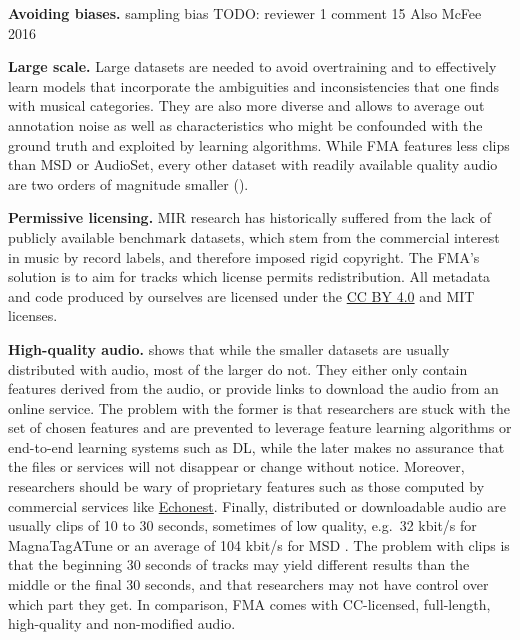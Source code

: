 \documentclass{article}
\newcommand{\todo}[1]{{\color{red} #1}}
\begin{document}
\textbf{Avoiding biases.} sampling bias TODO: reviewer 1 comment 15 \cite{mgr_eval_2} Also McFee 2016

\textbf{Large scale.} Large datasets are needed to avoid overtraining and to effectively learn models that incorporate the ambiguities and inconsistencies that one finds with musical categories. They are also more diverse and allows to average out annotation noise as well as characteristics who might be confounded with the ground truth and exploited by learning algorithms.
While FMA features less clips than MSD or AudioSet, every other dataset with readily available quality audio are two orders of magnitude smaller ().

\textbf{Permissive licensing.} MIR research has historically suffered from the lack of publicly available benchmark datasets, which stem from the commercial interest in music by record labels, and therefore imposed rigid copyright.
The FMA's solution is to aim for tracks which license permits redistribution.
All metadata and code produced by ourselves are licensed under the \href{https://creativecommons.org/licenses/by/4.0)}{
CC BY 4.0} and MIT licenses.

\textbf{High-quality audio.}
 shows that while the smaller datasets are usually distributed with audio, most of the larger do not.
They either only contain features derived from the audio, or provide links to download the audio from an online service. The problem with the former is that researchers are stuck with the set of chosen features and are prevented to leverage feature learning algorithms or end-to-end learning systems such as DL, while the later makes no assurance that the files or services will not disappear or change without notice.
Moreover, researchers should be wary of proprietary features such as those computed by commercial services like \href{http://the.echonest.com/}{Echonest}. %
Finally, distributed or downloadable audio are usually clips of 10 to 30 seconds, sometimes of low quality, e.g.\ 32 kbit/s for MagnaTagATune or an average of 104 kbit/s for MSD \cite{msd_features}. The problem with clips is that the beginning 30 seconds of tracks may yield different results than the middle or the final 30 seconds, and that researchers may not have control over which part they get.
In comparison, FMA comes with CC-licensed, full-length, high-quality and non-modified audio.
\end{document}
